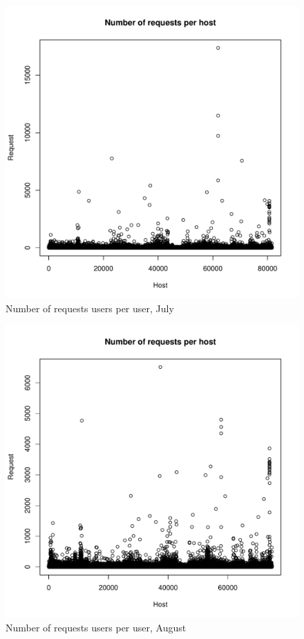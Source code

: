 \documentclass[english]{article}
\begin{document}
\begin{figure}[H]
\centerline{\includegraphics{Weblogs/Jul/NumberOfRequestsPerhost.pdf}}
\caption{Number of requests users per user, July}
\end{figure}
\begin{figure}[H]
\centerline{\includegraphics{Weblogs/Aug/NumberOfRequestsPerhost.pdf}}
\caption{Number of requests users per user, August}
\end{figure}
\end{document}

